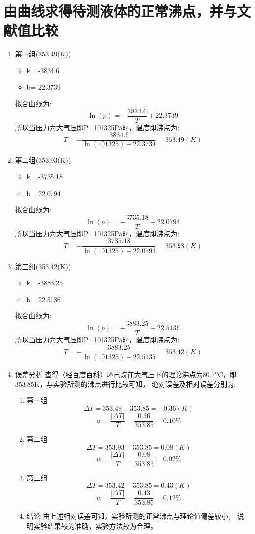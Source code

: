\documentclass[11pt]{report}
\begin{document}
\section{由曲线求得待测液体的正常沸点，并与文献值比较}
\label{sec:org99f64d5}
\begin{enumerate}
\item 第一组(353.49(K))
\label{sec:org68014ba}
\begin{itemize}
\item k= -3834.6
\item b= 22.3739
\end{itemize}
拟合曲线为:
\[
     \ln(p)=-\frac{3834.6}{T}+22.3739
     \]
所以当压力为大气压即P=101325Pa时，温度即沸点为:
\[
     T=-\frac{3834.6}{\ln(101325)-22.3739}=353.49(K)
     \]
\item 第二组(353.93(K))
\label{sec:orga9d3cad}
\begin{itemize}
\item k= -3735.18
\item b= 22.0794
\end{itemize}
拟合曲线为:
\[
     \ln(p)=-\frac{3735.18}{T}+22.0794
     \]
所以当压力为大气压即P=101325Pa时，温度即沸点为:
\[
     T=-\frac{3735.18}{\ln(101325)-22.0794}=353.93(K)
     \]
\item 第三组(353.42(K))
\label{sec:org5fbba76}
\begin{itemize}
\item k= -3883.25
\item b= 22.5136
\end{itemize}
拟合曲线为:
\[
     \ln(p)=-\frac{3883.25}{T}+22.5136
     \]
所以当压力为大气压即P=101325Pa时，温度即沸点为:
\[
     T=-\frac{3883.25}{\ln(101325)-22.5136}=353.42(K)
     \]
\item 误差分析
\label{sec:orgdd8df57}
查得（经百度百科）环己烷在大气压下的理论沸点为80.7\textsuperscript{o}C，即353.85K，与实验所测的沸点进行比较可知，
绝对误差及相对误差分别为:
\begin{enumerate}
\item 第一组
\label{sec:orgf5e87ae}
\[
      \Delta T=353.49-353.85=-0.36(K)
      \]
\[
      w=\frac{|\Delta T|}{T}=\frac{0.36}{353.85}=0.10\%
      \]
\item 第二组
\label{sec:org7b9eba0}
\[
      \Delta T=353.93-353.85=0.08(K)
      \]
\[
      w=\frac{|\Delta T|}{T}=\frac{0.08}{353.85}=0.02\%
      \]
\item 第三组
\label{sec:orgcbb65f0}
\[
      \Delta T=353.42-353.85=0.43(K)
      \]
\[
      w=\frac{|\Delta T|}{T}=\frac{0.43}{353.85}=0.12\%
      \]
\item 结论
\label{sec:orgc3fe4b5}
由上述相对误差可知，实验所测的正常沸点与理论值偏差较小，
说明实验结果较为准确，实验方法较为合理。
\end{enumerate}
\end{enumerate}
\end{document}
